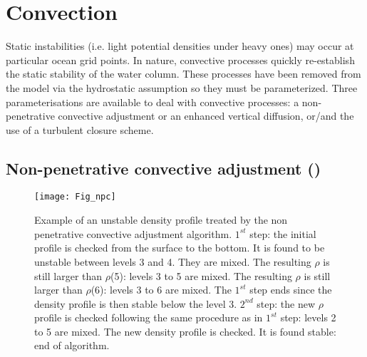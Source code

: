 \documentclass[../tex_main/NEMO_manual]{subfiles}
\begin{document}
\section{Convection}
\label{sec:ZDF_conv}


Static instabilities (i.e. light potential densities under heavy ones) may 
occur at particular ocean grid points. In nature, convective processes 
quickly re-establish the static stability of the water column. These 
processes have been removed from the model via the hydrostatic 
assumption so they must be parameterized. Three parameterisations 
are available to deal with convective processes: a non-penetrative 
convective adjustment or an enhanced vertical diffusion, or/and the 
use of a turbulent closure scheme.

\subsection[Non-penetrative convective adjmt (\protect\np{ln\_tranpc}\forcode{ = .true.})]
				{Non-penetrative convective adjustment (\protect{})}
\label{subsec:ZDF_npc}


\begin{figure}[!htb]  	\begin{center}
\texttt{[image: Fig\_npc]}
\caption{  \protect\label{fig:npc} 
Example of an unstable density profile treated by the non penetrative 
convective adjustment algorithm. $1^{st}$ step: the initial profile is checked from 
the surface to the bottom. It is found to be unstable between levels 3 and 4. 
They are mixed. The resulting $\rho$ is still larger than $\rho$(5): levels 3 to 5 
are mixed. The resulting $\rho$ is still larger than $\rho$(6): levels 3 to 6 are 
mixed. The $1^{st}$ step ends since the density profile is then stable below 
the level 3. $2^{nd}$ step: the new $\rho$ profile is checked following the same 
procedure as in $1^{st}$ step: levels 2 to 5 are mixed. The new density profile 
is checked. It is found stable: end of algorithm.}
\end{center}  	\end{figure}
\end{document}
